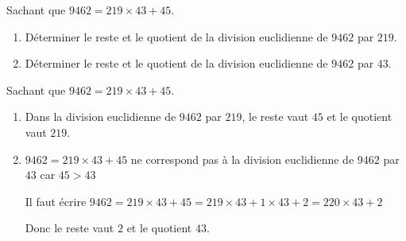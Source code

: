 \begin{exercice*}
    Sachant que $\num{9462}=219\times 43 + 45$.
    \begin{enumerate}
        \item Déterminer le reste et le quotient de la division euclidienne de $\num{9462}$ par $219$.
        \item Déterminer le reste et le quotient de la division euclidienne de $\num{9462}$ par $43$.
    \end{enumerate}
\end{exercice*}
\begin{corrige}
    Sachant que $\num{9462}=219\times 43 + 45$.
    
    \begin{enumerate}
        \item Dans la division euclidienne de $\num{9462}$ par $219$, le reste vaut $45$ et le quotient vaut $219$.
        \item $\num{9462}=219\times 43 + 45$ ne correspond pas à la division euclidienne de $\num{9462}$ par $43$ car $45>43$ 
        
        Il faut écrire $\num{9462}=219\times 43 + 45 = 219\times 43 + 1\times 43 + 2 = 220\times 43 +2$
        
        Donc le reste vaut $2$ et le quotient $43$.
    \end{enumerate}    
\end{corrige}

